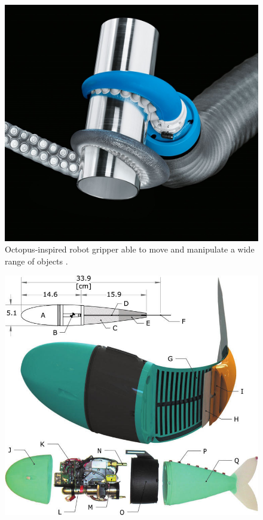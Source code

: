   \begin{minipage}{\linewidth}
      \centering
      \begin{minipage}{0.44\linewidth}
          \begin{figure}[H]
              \includegraphics[width=\linewidth]{Figures/tentaclegripper (2).jpg}
              \caption{Octopus-inspired robot gripper able to move and manipulate a wide range of objects \cite{octopus}.}
          \end{figure}
      \end{minipage}
      \hspace{0.05\linewidth}
      \begin{minipage}{0.44\linewidth}
          \begin{figure}[H]
              \includegraphics[width=\linewidth]{Figures/fish.jpg}

\end{figure}
\end{minipage}
\end{minipage}
